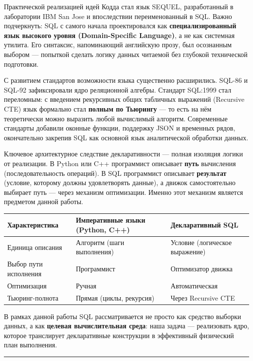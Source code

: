 \documentclass[a4paper,12pt]{report}
\begin{document}
Практической реализацией идей Кодда стал язык SEQUEL, разработанный в лаборатории IBM San Jose и впоследствии переименованный в SQL. Важно подчеркнуть: SQL с самого начала проектировался как \textbf{специализированный язык высокого уровня (Domain-Specific Language)}, а не как системная утилита. Его синтаксис, напоминающий английскую прозу, был осознанным выбором — попыткой сделать логику данных читаемой без глубокой технической подготовки.

С развитием стандартов возможности языка существенно расширились. SQL-86 и SQL-92 зафиксировали ядро реляционной алгебры. Стандарт SQL:1999 стал переломным: с введением рекурсивных общих табличных выражений (Recursive CTE) язык формально стал \textbf{полным по Тьюрингу} — то есть на нём теоретически можно выразить любой вычислимый алгоритм. Современные стандарты добавили оконные функции, поддержку JSON и временных рядов, окончательно закрепив SQL как основной язык аналитической обработки данных.

Ключевое архитектурное следствие декларативности — полная изоляция логики от реализации. В Python или C++ программист описывает \textbf{путь} вычисления (последовательность операций). В SQL программист описывает \textbf{результат} (условие, которому должны удовлетворять данные), а движок самостоятельно выбирает путь — через механизм оптимизации. Именно этот механизм является предметом данной работы.

\begin{longtable}{|l|l|l|}
\hline
Характеристика & Императивные языки (Python, C++) & Декларативный SQL \\ \hline
Единица описания & Алгоритм (шаги выполнения) & Условие (логическое выражение) \\ \hline
Выбор пути исполнения & Программист & Оптимизатор движка \\ \hline
Оптимизация & Ручная & Автоматическая \\ \hline
Тьюринг-полнота & Прямая (циклы, рекурсия) & Через Recursive CTE \\ \hline
\end{longtable}

В рамках данной работы SQL рассматривается не просто как средство выборки данных, а как \textbf{целевая вычислительная среда}: наша задача — реализовать ядро, которое транслирует декларативные конструкции в эффективный физический план выполнения.

\vspace{0.5cm}\hrule\vspace{0.5cm}
\end{document}
